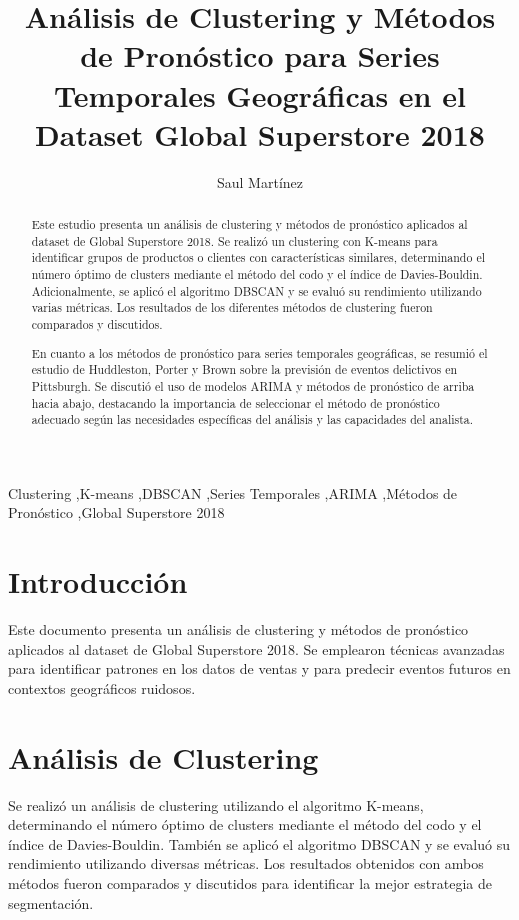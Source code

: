 \documentclass[preprint,12pt]{elsarticle}
\begin{document}
\begin{frontmatter}

\title{Análisis de Clustering y Métodos de Pronóstico para Series Temporales Geográficas en el Dataset Global Superstore 2018}

\author[1]{Saul Martínez}


\begin{abstract}
Este estudio presenta un análisis de clustering y métodos de pronóstico aplicados al dataset de Global Superstore 2018. Se realizó un clustering con K-means para identificar grupos de productos o clientes con características similares, determinando el número óptimo de clusters mediante el método del codo y el índice de Davies-Bouldin. Adicionalmente, se aplicó el algoritmo DBSCAN y se evaluó su rendimiento utilizando varias métricas. Los resultados de los diferentes métodos de clustering fueron comparados y discutidos.

En cuanto a los métodos de pronóstico para series temporales geográficas, se resumió el estudio de Huddleston, Porter y Brown sobre la previsión de eventos delictivos en Pittsburgh. Se discutió el uso de modelos ARIMA y métodos de pronóstico de arriba hacia abajo, destacando la importancia de seleccionar el método de pronóstico adecuado según las necesidades específicas del análisis y las capacidades del analista.

\end{abstract}

\begin{keyword}
Clustering \sep K-means \sep DBSCAN \sep Series Temporales \sep ARIMA \sep Métodos de Pronóstico \sep Global Superstore 2018
\end{keyword}

\end{frontmatter}

\section{Introducción}
Este documento presenta un análisis de clustering y métodos de pronóstico aplicados al dataset de Global Superstore 2018. Se emplearon técnicas avanzadas para identificar patrones en los datos de ventas y para predecir eventos futuros en contextos geográficos ruidosos.

\section{Análisis de Clustering}
Se realizó un análisis de clustering utilizando el algoritmo K-means, determinando el número óptimo de clusters mediante el método del codo y el índice de Davies-Bouldin. También se aplicó el algoritmo DBSCAN y se evaluó su rendimiento utilizando diversas métricas. Los resultados obtenidos con ambos métodos fueron comparados y discutidos para identificar la mejor estrategia de segmentación.
\end{document}
